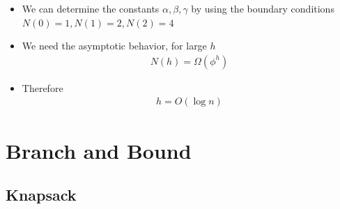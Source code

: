 \documentclass{beamer}
\begin{document}
\begin{frame}
  \begin{itemize}
  \item We can determine the constants $\alpha,\beta,\gamma$ by using the boundary conditions $ N(0)=1, N(1)=2 ,N(2)=4$

\item We need the asymptotic behavior, for large $h$
  \begin{align*}
    N(h)=\Omega( \phi^h)
  \end{align*}
\item Therefore 
  \begin{align*}
    h=O(\log n)
  \end{align*}
  \end{itemize}
\end{frame}






\section{Branch and Bound}

\subsection{Knapsack}
\end{document}
